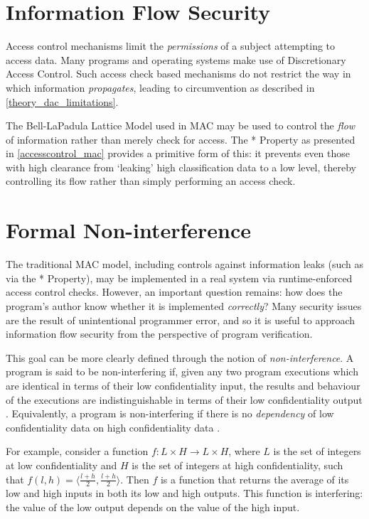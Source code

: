 \section{Information Flow Security}

Access control mechanisms limit the \textit{permissions} of a subject attempting to access data. Many programs and operating systems make use of Discretionary Access Control. Such access check based mechanisms do not restrict the way in which information \textit{propagates}, leading to circumvention as described in \ref{theory_dac_limitations}.

The Bell-LaPadula Lattice Model used in MAC may be used to control the \textit{flow} of information rather than merely check for access. The * Property as presented in \ref{accesscontrol_mac} provides a primitive form of this: it prevents even those with high clearance from `leaking' high classification data to a low level, thereby controlling its flow rather than simply performing an access check.

\section{Formal Non-interference} \label{theory_if_noninterference}

The traditional MAC model, including controls against information leaks (such as via the * Property), may be implemented in a real system via runtime-enforced access control checks. However, an important question remains: how does the program's author know whether it is implemented \textit{correctly}? Many security issues are the result of unintentional programmer error, and so it is useful to approach information flow security from the perspective of program verification.

This goal can be more clearly defined through the notion of \textit{non-interference}. A program is said to be non-interfering if, given any two program executions which are identical in terms of their low confidentiality input, the results and behaviour of the executions are indistinguishable in terms of their low confidentiality output \cite{sabelfeld2003if}. Equivalently, a program is non-interfering if there is no \textit{dependency} of low confidentiality data on high confidentiality data \cite{cohen1977declassification}.

For example, consider a function $ f: L \times H \rightarrow L \times H $, where $ L $ is the set of integers at low confidentiality and $ H $ is the set of integers at high confidentiality, such that $ f(l, h) = \langle \frac{l + h}{2}, \frac{l + h}{2} \rangle $. Then $ f $ is a function that returns the average of its low and high inputs in both its low and high outputs. This function is interfering: the value of the low output depends on the value of the high input.

